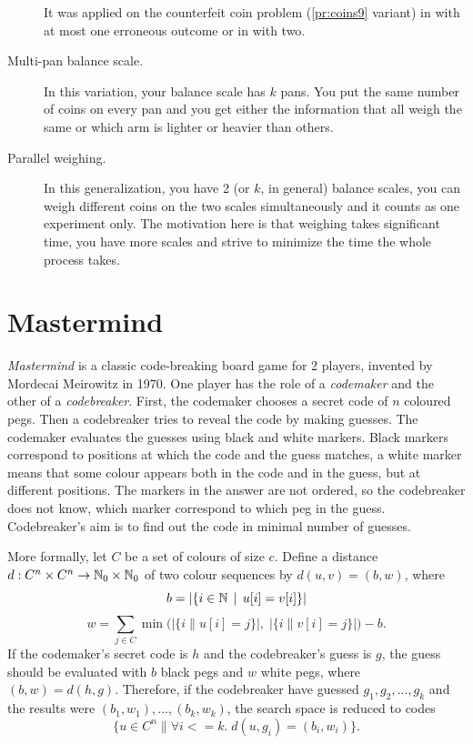 \begin{description}
  It was applied on the counterfeit coin problem (\autoref{pr:coins9} variant)
  in \cite{coins-unreliable} with at most one erroneous outcome or in
  \cite{coins-unreliable2} with two.
\item[Multi-pan balance scale.]
  In this variation, your balance scale has $k$ pans.
  You put the same number of coins on every pan and
    you get either the information that all
    weigh the same or which arm is lighter or heavier
    than others\cite{coins-multiplearm}.
\item[Parallel weighing.]
  In this generalization, you have 2 (or $k$, in general)
    balance scales, you can weigh different coins on
    the two scales simultaneously and it counts
    as one experiment only\cite{coins-parallel}.
  The motivation here is that weighing takes significant time,
  you have more scales and strive to minimize the time the whole process takes.
\end{description}

\section{Mastermind} \label{sec:mm}

\emph{Mastermind} is a classic code-breaking board game for 2 players,
  invented by Mordecai Meirowitz in 1970.
One player has the role of a \emph{codemaker} and the other of a \emph{codebreaker}.
First, the codemaker chooses a secret code of $n$ coloured pegs.
Then a codebreaker tries to reveal the code by making guesses.
The codemaker evaluates the guesses using black and white markers.
Black markers correspond to positions at which the code and the guess matches,
  a white marker means that some colour appears both in the code and in the guess,
  but at different positions.
The markers in the answer are not ordered, so the codebreaker does not know,
  which marker correspond to which peg in the guess.
Codebreaker's aim is to find out the code in minimal number of guesses.

More formally, let $C$ be a set of colours of size $c$.
Define a distance $d : C^n\times C^n -> \mathbb{N}_0\times\mathbb{N}_0$
  of two colour sequences by $d(u, v) = (b, w)$, where
\[
b = |\{ i \in\mathbb{N} \:\:|\:\: u[i] = v[i] \}|
\]
\[
w = \sum_{j\in C} \min\big(\big|\{ i \| u[i] = j \}\big|,\;
                           \big|\{ i \| v[i] = j\}\big|\big)  - b.
\]
If the codemaker's secret code is $h$ and the codebreaker's guess is $g$,
  the guess should be evaluated with $b$ black pegs and $w$ white pegs, where
  $(b,w) = d(h,g)$.
Therefore, if the codebreaker have guessed $g_1, g_2, ..., g_k$ and the results
  were $(b_1,w_1), ..., (b_k, w_k)$,
  the search space is reduced to codes
  \[
  \{ u\in C^n \| \forall i<=k.\; d(u, g_i) = (b_i,w_i)\}.
  \]

